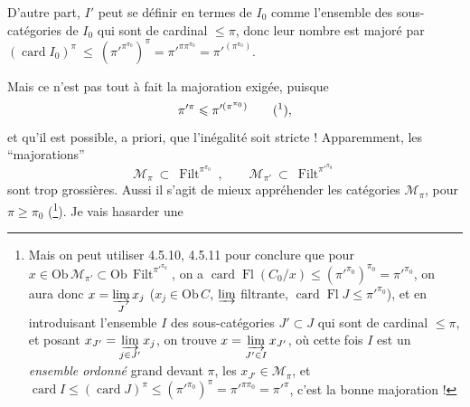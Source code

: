 \documentclass[11pt]{article}
\newcommand{\printedpage}[1]{\if\relax\detokenize{#1}\relax\else\marginpar{\footnotesize p.~#1}\fi}
\newcommand{\msp}[1]{\marginpar{\footnotesize [#1]}}
\newcommand{\Ob}{\mathrm{Ob}\,}
\newcommand{\card}{\operatorname{card}}
\newcommand{\Fl}{\operatorname{Fl}}
\newcommand{\Filt}{\operatorname{Filt}}
\begin{document}
D'autre part, $I'$ peut se définir en termes de $I_0$ comme l'ensemble des sous-catégories de $I_0$ qui sont de cardinal $\leqslant \pi$, donc leur nombre est majoré par $(\card I_0)^\pi \ \leqslant \ (\pi'^{\pi^{\pi_0}})^\pi = \pi'^{\pi\pi^{\pi_0}} = \pi'^{(\pi^{\pi_0})}$.

Mais ce n'est pas tout à fait la majoration exigée, puisque
\[
\pi'^{\pi} \leqslant \pi'^{(\pi^{\pi_0})} \qquad \text{(\footnotemark)},
\]
%
et qu'il est possible, a priori, que l'inégalité
\printedpage{38}
\msp{page 125}
soit stricte ! Apparemment, les ``majorations''
\[
\mathcal{M}_\pi \ \subset \ \Filt^{\pi^{\pi_0}} \ , \qquad \mathcal{M}_{\pi'} \ \subset \ \Filt^{\pi'^{\pi_0}}
\]
sont trop grossières. Aussi il s'agit de mieux appréhender les catégories $\mathcal{M}_\pi$, pour $\pi \geqslant \pi_0$ (\footnote{Mais on peut utiliser 4.5.10, 4.5.11 pour conclure que pour $x \in \Ob \mathcal{M}_{\pi'} \subset \Ob \Filt^{\pi'^{\pi_0}}$, on a $\card \Fl(C_0/x) \leqslant (\pi'^{\pi_0})^{\pi_0} = \pi'^{\pi_0}$, on aura donc $x = \varinjlim\limits_{J} x_j$ ($x_j \in \Ob C$, $\varinjlim$ filtrante, $\card \Fl J \leqslant \pi'^{\pi_0}$), et en introduisant l'ensemble $I$ des sous-catégories $J' \subset J$ qui sont de cardinal $\leqslant \pi$, et posant $x_{J'} = \varinjlim\limits_{j \in J'} x_j$, on trouve $x = \varinjlim\limits_{J' \in I} x_{J'}$, où cette fois $I$ est un \textit{ensemble ordonné} grand devant $\pi$, les $x_{J'} \in \mathcal{M}_\pi$, et $\card I \leqslant (\card J)^\pi \leqslant (\pi'^{\pi_0})^\pi = \pi'^{\pi\pi_0} = \pi'^{\pi}$, c'est la bonne majoration !}). Je vais hasarder une
\end{document}
